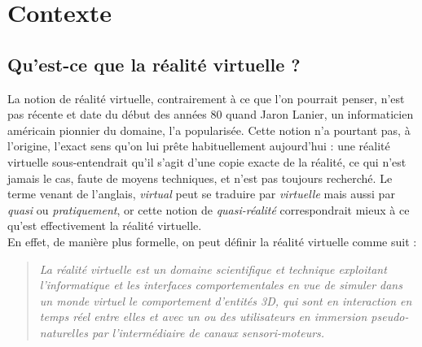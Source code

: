 \section{Contexte}

\subsection{Qu'est-ce que la réalité virtuelle ?}La notion de réalité virtuelle, contrairement à ce que l'on pourrait penser, n'est pas récente et date du début des années 80 quand Jaron Lanier, un informaticien américain pionnier du domaine, l'a popularisée. Cette notion n'a pourtant pas, à l'origine, l'exact sens qu'on lui prête habituellement aujourd'hui : une réalité virtuelle sous-entendrait qu'il s'agit d'une copie exacte de la réalité, ce qui n'est jamais le cas, faute de moyens techniques, et n'est pas toujours recherché. Le terme venant  de l'anglais, \emph{virtual} peut se traduire par \emph{virtuelle} mais aussi par \emph{quasi} ou \emph{pratiquement}, or cette notion de \emph{quasi-réalité} correspondrait mieux à ce qu'est effectivement la réalité virtuelle. \\

En effet, de manière plus formelle, on peut définir la réalité virtuelle comme suit :

\begin{quote}\og \emph{La réalité virtuelle est un domaine scientifique et technique exploitant l'informatique et les interfaces comportementales en vue de simuler dans un monde virtuel le comportement d'entités 3D, qui sont en interaction en temps réel entre elles et avec un ou des utilisateurs en immersion pseudo-naturelles par l'intermédiaire de canaux sensori-moteurs.} \fg{}\end{quote}\cite{traiteRV1}


